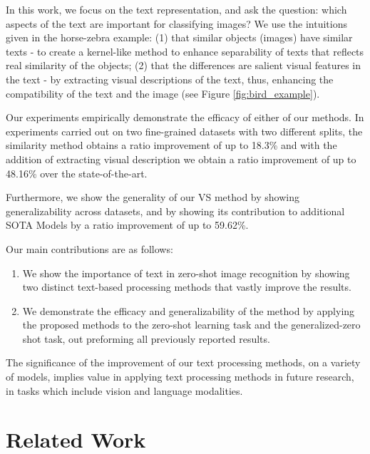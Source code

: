 \documentclass[11pt,a4paper]{article}
\begin{document}
In this work, we focus on the text representation, and ask the question: which aspects of the text are important for classifying images? We use the intuitions given in the horse-zebra example: (1) that similar objects (images) have similar texts - to create a kernel-like method to enhance separability of texts that reflects real similarity of the objects; (2) that the differences are salient visual features in the text - by extracting visual descriptions of the text, thus, enhancing the compatibility of the text and the image (see Figure \ref{fig:bird_example}).\par

\par


Our experiments empirically demonstrate the 
efficacy of either of our methods. 
In experiments carried out on two fine-grained datasets with two different splits, the similarity method obtains a ratio improvement of up to 18.3\% and with the addition of extracting visual description we obtain a ratio improvement of up to 48.16\% over the state-of-the-art.

Furthermore, we show the generality of our VS method by showing generalizability across datasets, and by showing its contribution to additional SOTA Models by a ratio improvement of up to 59.62\%.



Our main contributions are as follows:  
\begin{enumerate}
  \item We show the importance of text in zero-shot image recognition by showing two distinct text-based processing methods that vastly improve the results.
  
\item We demonstrate the efficacy and generalizability of the method by applying the proposed methods to the zero-shot learning task and the generalized-zero shot task, out preforming all previously reported results.
    

\end{enumerate}

The significance of the improvement of our text processing methods, on a variety of models, implies value in applying text processing methods in future research, in tasks which include vision and language modalities.


\par


\section{Related Work}
\end{document}
